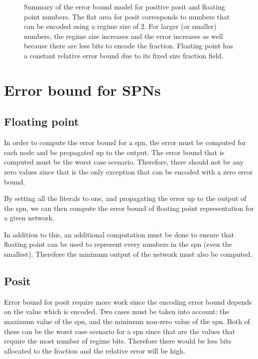 \begin{figure}[!ht]
	\centering
	
	\caption{Summary of the error bound model for positive posit and floating point numbers. The flat area for posit corresponds to numbers that can be encoded using a regime size of 2. For larger (or smaller) numbers, the regime size increases and the error increases as well because there are less bits to encode the fraction. Floating point has a constant relative error bound due to its fixed size fraction field.}
	\label{fig:fp_err_model}
\end{figure}


\section{Error bound for SPNs}

\subsection{Floating point}

In order to compute the error bound for a \gls{spn}, the error must be computed for each node and be propagated up to the output. The error bound that is computed must be the worst case scenario. Therefore, there should not be any zero values since that is the only exception that can be encoded with a zero error bound.

By setting all the literals to one, and propagating the error up to the output of the \gls{spn}, we can then compute the error bound of floating point representation for a given network.

In addition to this, an additional computation must be done to ensure that floating point can be used to represent every numbers in the \gls{spn} (even the smallest). Therefore the minimum output of the network must also be computed.

\subsection{Posit}
Error bound for posit require more work since the encoding error bound depends on the value which is encoded. Two cases must be taken into account: the maximum value of the \gls{spn}, and the minimum non-zero value of the \gls{spn}. Both of these can be the worst case scenario for a \gls{spn} since that are the values that require the most number of regime bits. Therefore there would be less bits allocated to the fraction and the relative error will be high.

